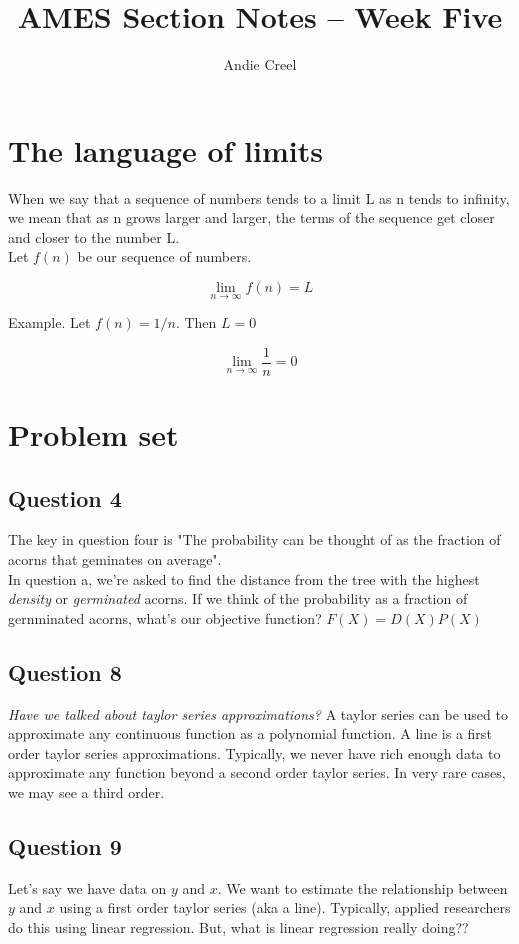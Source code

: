 \documentclass{article}
\title{AMES Section Notes -- Week Five}
\author{Andie Creel}
\begin{document}
\maketitle

\section{The language of limits}

When we say that a sequence of numbers tends to a limit L as n tends to infinity, we mean that as n grows larger and larger, the terms of the sequence get closer and closer to the number L.\\

Let $f(n)$ be our sequence of numbers.

\[ \lim_{n \to \infty} f(n) = L \]

Example. Let $f(n) = 1/n$. Then $L = 0$

\[\lim_{n \to \infty} \frac{1}{n} = 0\]

\section{Problem set}
\subsection{Question 4}

The key in question four is "The probability can be thought of as the fraction of acorns that geminates on average". \\

In question a, we're asked to find the distance from the tree with the highest \textit{density} or \textit{germinated} acorns. If we think of the probability as a fraction of gernminated acorns, what's our objective function? $F(X) = D(X)P(X)$

\subsection{Question 8}
\textit{Have we talked about taylor series approximations?} A taylor series can be used to approximate any continuous function as a polynomial function. A line is a first order taylor series approximations. Typically, we never have rich enough data to approximate any function beyond a second order taylor series. In very rare cases, we may see a third order. 

\subsection{Question 9}
Let's say we have data on $y$ and $x$. We want to estimate the relationship between $y$ and $x$ using a first order taylor series (aka a line). Typically, applied researchers do this using linear regression. But, what is linear regression really doing?? \\
\end{document}
